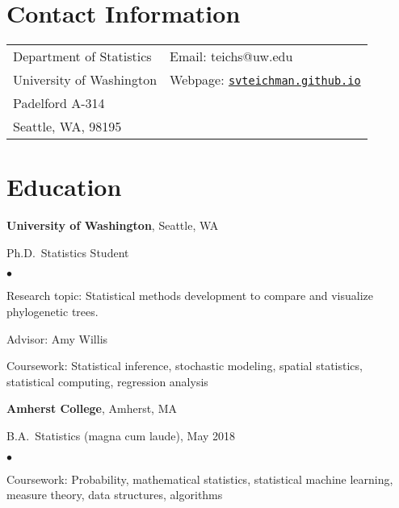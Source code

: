 \documentclass[margin,centered]{res}
\newenvironment{list1}{
  \begin{list}{\ding{113}}{%
      \setlength{\itemsep}{0in}
      \setlength{\parsep}{0in} \setlength{\parskip}{0in}
      \setlength{\topsep}{0in} \setlength{\partopsep}{0in}
      \setlength{\leftmargin}{0.17in}}}{\end{list}}
\newenvironment{list2}{
  \begin{list}{$\bullet$}{%
      \setlength{\itemsep}{0in}
      \setlength{\parsep}{0in} \setlength{\parskip}{0in}
      \setlength{\topsep}{0in} \setlength{\partopsep}{0in}
      \setlength{\leftmargin}{0.2in}}}{\end{list}}
\begin{document}
\vspace*{.1in}


\begin{resume}

\section{\sc Contact Information}

\vspace{.05in}
\begin{tabular}{@{}p{2.0in}p{2.9in}}
Department of Statistics& Email:  teichs@uw.edu \\
University of Washington  &Webpage: \href{https://svteichman.github.io/}{\texttt{svteichman.github.io}}
\\
Padelford A-314	                   	   \\
Seattle, WA, 98195             & \\






\end{tabular}

\section{\sc Education}
{\bf University of Washington}, Seattle, WA
\begin{list1}
\item[] 
Ph.D.~Statistics Student
\begin{list2}
\vspace*{.05in}
\item Research topic: Statistical methods development to compare and visualize phylogenetic trees.
\item Advisor: Amy Willis
\item Coursework: Statistical inference, stochastic modeling, spatial statistics, statistical computing, regression analysis
\end{list2}
\end{list1}



{\bf Amherst College}, Amherst, MA
\begin{list1}
\item[] B.A.~Statistics (magna cum laude), May 2018
\begin{list2}
\vspace*{.05in}
\item Coursework: Probability, mathematical statistics, statistical machine learning, measure theory, data
structures, algorithms
\end{list2}
\end{list1}



\end{resume}
\end{document}
